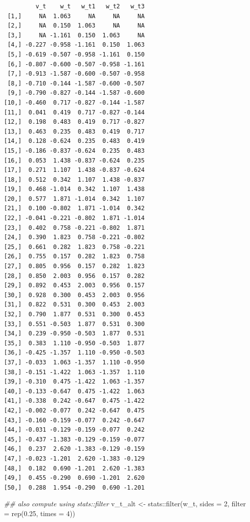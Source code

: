 \documentclass[
  letterpaper,
  DIV=11,
  numbers=noendperiod]{scrreprt}
\newenvironment{Shaded}{\begin{snugshade}}{\end{snugshade}}
\newcommand{\AttributeTok}[1]{\textcolor[rgb]{0.40,0.45,0.13}{#1}}
\newcommand{\DecValTok}[1]{\textcolor[rgb]{0.68,0.00,0.00}{#1}}
\newcommand{\DocumentationTok}[1]{\textcolor[rgb]{0.37,0.37,0.37}{\textit{#1}}}
\newcommand{\FloatTok}[1]{\textcolor[rgb]{0.68,0.00,0.00}{#1}}
\newcommand{\FunctionTok}[1]{\textcolor[rgb]{0.28,0.35,0.67}{#1}}
\newcommand{\NormalTok}[1]{\textcolor[rgb]{0.00,0.23,0.31}{#1}}
\newcommand{\OtherTok}[1]{\textcolor[rgb]{0.00,0.23,0.31}{#1}}
\newcommand{\SpecialCharTok}[1]{\textcolor[rgb]{0.37,0.37,0.37}{#1}}
\begin{document}
\begin{verbatim}
         v_t    w_t   w_t1   w_t2   w_t3
 [1,]     NA  1.063     NA     NA     NA
 [2,]     NA  0.150  1.063     NA     NA
 [3,]     NA -1.161  0.150  1.063     NA
 [4,] -0.227 -0.958 -1.161  0.150  1.063
 [5,] -0.619 -0.507 -0.958 -1.161  0.150
 [6,] -0.807 -0.600 -0.507 -0.958 -1.161
 [7,] -0.913 -1.587 -0.600 -0.507 -0.958
 [8,] -0.710 -0.144 -1.587 -0.600 -0.507
 [9,] -0.790 -0.827 -0.144 -1.587 -0.600
[10,] -0.460  0.717 -0.827 -0.144 -1.587
[11,]  0.041  0.419  0.717 -0.827 -0.144
[12,]  0.198  0.483  0.419  0.717 -0.827
[13,]  0.463  0.235  0.483  0.419  0.717
[14,]  0.128 -0.624  0.235  0.483  0.419
[15,] -0.186 -0.837 -0.624  0.235  0.483
[16,]  0.053  1.438 -0.837 -0.624  0.235
[17,]  0.271  1.107  1.438 -0.837 -0.624
[18,]  0.512  0.342  1.107  1.438 -0.837
[19,]  0.468 -1.014  0.342  1.107  1.438
[20,]  0.577  1.871 -1.014  0.342  1.107
[21,]  0.100 -0.802  1.871 -1.014  0.342
[22,] -0.041 -0.221 -0.802  1.871 -1.014
[23,]  0.402  0.758 -0.221 -0.802  1.871
[24,]  0.390  1.823  0.758 -0.221 -0.802
[25,]  0.661  0.282  1.823  0.758 -0.221
[26,]  0.755  0.157  0.282  1.823  0.758
[27,]  0.805  0.956  0.157  0.282  1.823
[28,]  0.850  2.003  0.956  0.157  0.282
[29,]  0.892  0.453  2.003  0.956  0.157
[30,]  0.928  0.300  0.453  2.003  0.956
[31,]  0.822  0.531  0.300  0.453  2.003
[32,]  0.790  1.877  0.531  0.300  0.453
[33,]  0.551 -0.503  1.877  0.531  0.300
[34,]  0.239 -0.950 -0.503  1.877  0.531
[35,]  0.383  1.110 -0.950 -0.503  1.877
[36,] -0.425 -1.357  1.110 -0.950 -0.503
[37,] -0.033  1.063 -1.357  1.110 -0.950
[38,] -0.151 -1.422  1.063 -1.357  1.110
[39,] -0.310  0.475 -1.422  1.063 -1.357
[40,] -0.133 -0.647  0.475 -1.422  1.063
[41,] -0.338  0.242 -0.647  0.475 -1.422
[42,] -0.002 -0.077  0.242 -0.647  0.475
[43,] -0.160 -0.159 -0.077  0.242 -0.647
[44,] -0.031 -0.129 -0.159 -0.077  0.242
[45,] -0.437 -1.383 -0.129 -0.159 -0.077
[46,]  0.237  2.620 -1.383 -0.129 -0.159
[47,] -0.023 -1.201  2.620 -1.383 -0.129
[48,]  0.182  0.690 -1.201  2.620 -1.383
[49,]  0.455 -0.290  0.690 -1.201  2.620
[50,]  0.288  1.954 -0.290  0.690 -1.201
\end{verbatim}

\begin{Shaded}
\begin{Highlighting}[]
\DocumentationTok{\#\# also compute using stats::filter}
\NormalTok{v\_t\_alt }\OtherTok{\textless{}{-}}\NormalTok{ stats}\SpecialCharTok{::}\FunctionTok{filter}\NormalTok{(w\_t, }\AttributeTok{sides =} \DecValTok{2}\NormalTok{, }\AttributeTok{filter =} \FunctionTok{rep}\NormalTok{(}\FloatTok{0.25}\NormalTok{, }\AttributeTok{times =} \DecValTok{4}\NormalTok{))}
\end{Highlighting}
\end{Shaded}
\end{document}

